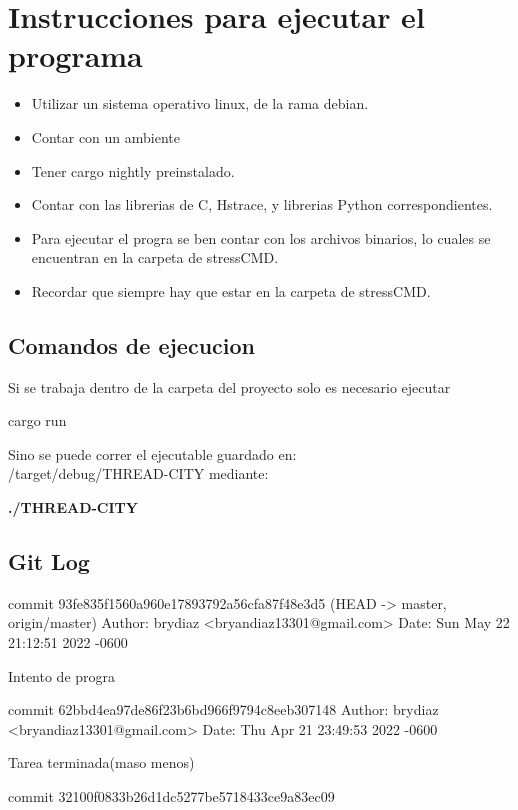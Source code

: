 \documentclass{article}
\begin{document}
\section{Instrucciones para ejecutar el programa}
\begin{itemize}
\item Utilizar un sistema operativo linux, de la rama debian.\\
\item Contar con un ambiente \\
\item Tener cargo nightly preinstalado.\\
\item Contar con las librerias de C, Hstrace, y librerias Python correspondientes.\\
\item Para ejecutar el progra se ben contar con los archivos binarios, lo cuales se encuentran en la carpeta de  stressCMD. \\
\item Recordar que siempre hay que estar en la carpeta de stressCMD.\\
\end{itemize}

\subsection{Comandos de ejecucion}
Si se trabaja dentro de la carpeta del proyecto solo es necesario ejecutar 
\item cargo run

Sino se puede correr el ejecutable guardado en: \\
/target/debug/THREAD-CITY mediante:
\item\textbf{ ./THREAD-CITY}


\subsection{Git Log}
commit 93fe835f1560a960e17893792a56cfa87f48e3d5 (HEAD -> master, origin/master)
Author: brydiaz <bryandiaz13301@gmail.com>
Date:   Sun May 22 21:12:51 2022 -0600

    Intento de progra

commit 62bbd4ea97de86f23b6bd966f9794c8eeb307148
Author: brydiaz <bryandiaz13301@gmail.com>
Date:   Thu Apr 21 23:49:53 2022 -0600

    Tarea terminada(maso menos)

commit 32100f0833b26d1dc5277be5718433ce9a83ec09
\end{document}
